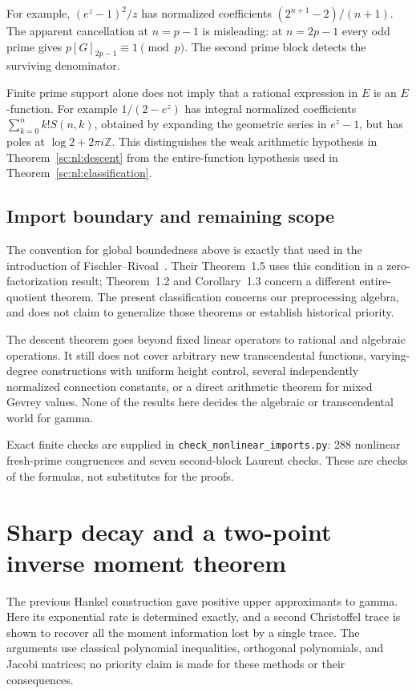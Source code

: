 \documentclass[11pt,a4paper]{article}
\theoremstyle{definition}
\theoremstyle{remark}
\theoremstyle{plain}
\numberwithin{equation}{section}
\begin{document}
For example, $(e^z-1)^2/z$ has normalized coefficients
$(2^{n+1}-2)/(n+1)$. The apparent cancellation at $n=p-1$ is misleading:
at $n=2p-1$ every odd prime gives $p[G]_{2p-1}\equiv1\pmod p$.
The second prime block detects the surviving denominator.

Finite prime support alone does not imply that a rational expression
in $E$ is an $E$-function. For example $1/(2-e^z)$ has integral
normalized coefficients $\sum_{k=0}^n k!S(n,k)$, obtained by expanding
the geometric series in $e^z-1$, but has poles at
$\log2+2\pi i\mathbb Z$. This distinguishes the weak arithmetic
hypothesis in Theorem~\ref{sc:nl:descent} from the entire-function
hypothesis used in Theorem~\ref{sc:nl:classification}.

\subsection{Import boundary and remaining scope}

The convention for global boundedness above is exactly that used in
the introduction of Fischler--Rivoal~\cite{FRzeros}.
Their Theorem~1.5 uses this condition in a zero-factorization result;
Theorem~1.2 and Corollary~1.3 concern a different entire-quotient theorem.
The present classification concerns our preprocessing algebra, and
does not claim to generalize those theorems or establish historical
priority.

The descent theorem goes beyond fixed linear operators to rational
and algebraic operations. It still does not cover arbitrary new
transcendental functions, varying-degree constructions with uniform
height control, several independently normalized connection constants,
or a direct arithmetic theorem for mixed Gevrey values. None of the
results here decides the algebraic or transcendental world for gamma.

Exact finite checks are supplied in \texttt{check\_nonlinear\_imports.py}:
288 nonlinear fresh-prime congruences and seven second-block Laurent
checks. These are checks of the formulas, not substitutes for the proofs.


\section{Sharp decay and a two-point inverse moment theorem}
\label{sc:sec:sharp-christoffel}

The previous Hankel construction gave positive upper approximants to
gamma.  Here its exponential rate is determined exactly, and a second
Christoffel trace is shown to recover all the moment information lost by
a single trace.  The arguments use classical polynomial inequalities,
orthogonal polynomials, and Jacobi matrices; no priority claim is made
for these methods or their consequences.
\end{document}
